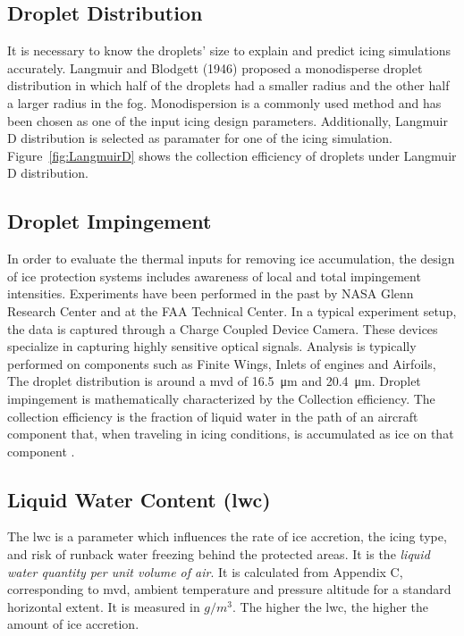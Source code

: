 \documentclass[english]{kththesis}
\begin{document}
\subsection{Droplet Distribution}
\label{subsec:medvoldia}
It is necessary to know the droplets' size to explain and predict icing simulations accurately. Langmuir and Blodgett (1946) proposed a monodisperse droplet distribution in which half of the droplets had a smaller radius and the other half a larger radius in the fog. Monodispersion is a commonly used method and has been chosen as one of the input icing design parameters. Additionally,  Langmuir D distribution is selected as paramater for one of the icing simulation. Figure~\ref{fig:LangmuirD} shows the collection efficiency of droplets under Langmuir D distribution. 

\subsection{Droplet Impingement}
In order to evaluate the thermal inputs for removing ice accumulation, the design of ice protection systems includes awareness of local and total impingement intensities. Experiments have been performed in the past by NASA Glenn Research Center and at the FAA Technical Center. In a typical experiment setup, the data is captured through a Charge Coupled Device Camera. These devices specialize in capturing highly sensitive optical signals. Analysis is typically performed on components such as Finite Wings, Inlets of engines and Airfoils, The droplet distribution is around a \acrshort{mvd} of \SI{16,5}{\micro\metre} and \SI{20,4}{\micro\metre}. Droplet impingement is mathematically characterized by the Collection efficiency. The collection efficiency is the fraction of liquid water in the path of an aircraft component that, when traveling in icing conditions, is accumulated as ice on that component \cite{skybrary}. 


\subsection{Liquid Water Content (\acrshort{lwc})}
\label{subsec:liqwatcon}The \acrshort{lwc} is a parameter which influences the rate of ice accretion, the icing type, and risk of runback water freezing behind the protected areas\cite{dtic}. It is the \textit{liquid water quantity per unit volume of air}. It is calculated from Appendix C, corresponding to \acrshort{mvd}, ambient temperature and pressure altitude for a standard horizontal extent. It is measured in $g/m^3$. The higher the \acrshort{lwc}, the higher the amount of ice accretion.
\end{document}
